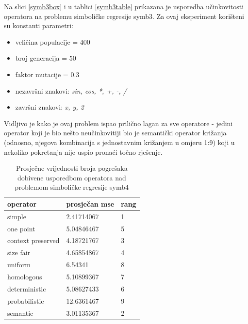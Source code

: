 Na slici \ref{symb3box} i u tablici \ref{symb3table} prikazana je usporedba učinkovitosti operatora na problemu simboličke regresije symb3. Za ovaj eksperiment korišteni su konstanti parametri:
\begin{itemize}
\item{veličina populacije = 400}
\item{broj generacija = 50}
\item{faktor mutacije = 0.3}
\item{nezavršni znakovi: \textit{sin, cos, *, +, -, /}}
\item{završni znakovi: \textit{x, y, 2}}
\end{itemize} 

Vidljivo je kako je ovaj problem ispao prilično lagan za sve operatore - jedini operator koji je bio nešto neučinkovitiji bio je semantički operator križanja (odnosno, njegova kombinacija s jednostavnim križanjem u omjeru 1:9) koji u nekoliko pokretanja nije uspio pronaći točno rješenje.



\begin{table}[H]
 	\centering
\caption{Prosječne vrijednosti broja pogrešaka dobivene usporedbom operatora nad problemom simboličke regresije symb4}
    \begin{tabular}{| l | l | l |}
    \hline
    \textbf{operator} & \textbf{prosječan mse} & \textbf{rang}\\ \hline
    simple & 2.41714067 & 1\\ \hline
    one point & 5.04846467 & 5\\ \hline
    context preserved & 4.18721767 & 3\\ \hline
    size fair & 4.65854867 & 4\\ \hline
    uniform & 6.54341 & 8\\ \hline
    homologous & 5.10899367 & 7\\ \hline
    deterministic & 5.08627433 & 6\\ \hline
    probabilistic & 12.6361467 & 9\\ \hline
    semantic & 3.01135367 & 2\\ \hline
    \end{tabular}
    
    
    \label{symb4table}
\end{table}

